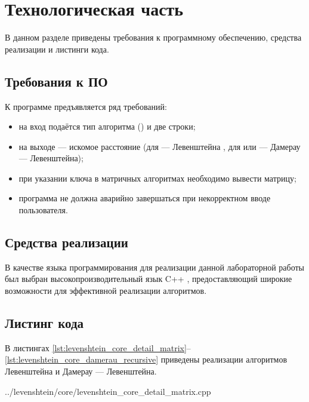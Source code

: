 \chapter{Технологическая часть}

В данном разделе приведены требования к программному обеспечению, средства реализации и листинги кода.

\section{Требования к ПО}

К программе предъявляется ряд требований:
\begin{itemize}
	\item на вход подаётся тип алгоритма () и две строки;
	\item на выходе — искомое расстояние (для  — Левенштейна , для   или  — Дамерау — Левенштейна);
	\item при указании ключа  в матричных алгоритмах необходимо вывести матрицу;
	\item программа не должна аварийно завершаться при некорректном вводе пользователя.
\end{itemize}

\section{Средства реализации}

В качестве языка программирования для реализации данной лабораторной работы был выбран высокопроизводительный язык C++ \cite{cpp17}, предоставляющий широкие возможности для эффективной реализации алгоритмов.

\section{Листинг кода}

В листингах \ref{lst:levenshtein_core_detail_matrix}--\ref{lst:levenshtein_core_damerau_recursive} приведены реализации алгоритмов Левенштейна и Дамерау — Левенштейна.

\begin{lstinputlisting}[
	caption={Вспомогательные функции для матричных алгоритмов},
	label={lst:levenshtein_core_detail_matrix},
	style={cpp},
	linerange={6-44}
]{../levenshtein/core/levenshtein_core_detail_matrix.cpp}
\end{lstinputlisting}

